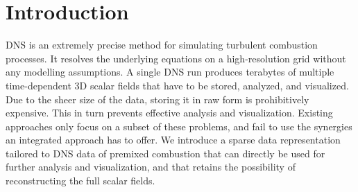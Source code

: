 
\section{Introduction}
\label{sec:intro}

\ac{DNS} is an extremely precise method for simulating turbulent combustion
processes. It resolves the underlying equations on a high-resolution grid
without any modelling assumptions. A single \ac{DNS} run produces terabytes of
multiple time-dependent \ac{3D} scalar fields that have to be stored, analyzed,
and visualized. Due to the sheer size of the data, storing it in raw form is
prohibitively expensive. This in turn prevents effective analysis and
visualization. Existing approaches only focus on a subset of these problems, and
fail to use the synergies an integrated approach has to offer. We introduce a
sparse data representation tailored to \ac{DNS} data of premixed combustion that
can directly be used for further analysis and visualization, and that retains
the possibility of reconstructing the full scalar fields.

%

